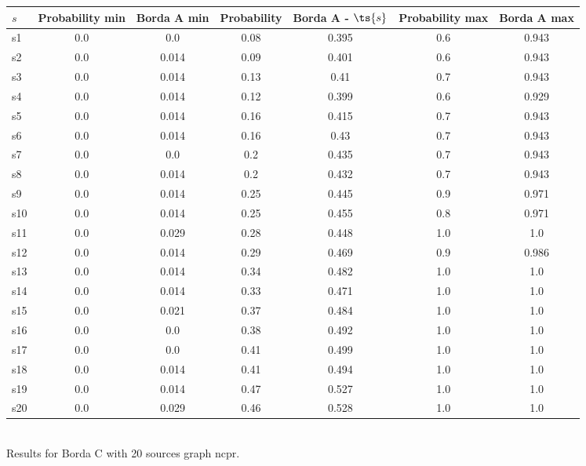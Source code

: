 \documentclass{article}
\begin{document}
\noindent\begin{tabular}{|l|c|c|c|c|c|c|}
\hline
$s$& Probability min & Borda A min & Probability & Borda A - $\ts{s}$ & Probability max & Borda A max\\
\hline
s1 &0.0 & 0.0 & 0.08 & 0.395 & 0.6 & 0.943\\
\hline
s2 &0.0 & 0.014 & 0.09 & 0.401 & 0.6 & 0.943\\
\hline
s3 &0.0 & 0.014 & 0.13 & 0.41 & 0.7 & 0.943\\
\hline
s4 &0.0 & 0.014 & 0.12 & 0.399 & 0.6 & 0.929\\
\hline
s5 &0.0 & 0.014 & 0.16 & 0.415 & 0.7 & 0.943\\
\hline
s6 &0.0 & 0.014 & 0.16 & 0.43 & 0.7 & 0.943\\
\hline
s7 &0.0 & 0.0 & 0.2 & 0.435 & 0.7 & 0.943\\
\hline
s8 &0.0 & 0.014 & 0.2 & 0.432 & 0.7 & 0.943\\
\hline
s9 &0.0 & 0.014 & 0.25 & 0.445 & 0.9 & 0.971\\
\hline
s10 &0.0 & 0.014 & 0.25 & 0.455 & 0.8 & 0.971\\
\hline
s11 &0.0 & 0.029 & 0.28 & 0.448 & 1.0 & 1.0\\
\hline
s12 &0.0 & 0.014 & 0.29 & 0.469 & 0.9 & 0.986\\
\hline
s13 &0.0 & 0.014 & 0.34 & 0.482 & 1.0 & 1.0\\
\hline
s14 &0.0 & 0.014 & 0.33 & 0.471 & 1.0 & 1.0\\
\hline
s15 &0.0 & 0.021 & 0.37 & 0.484 & 1.0 & 1.0\\
\hline
s16 &0.0 & 0.0 & 0.38 & 0.492 & 1.0 & 1.0\\
\hline
s17 &0.0 & 0.0 & 0.41 & 0.499 & 1.0 & 1.0\\
\hline
s18 &0.0 & 0.014 & 0.41 & 0.494 & 1.0 & 1.0\\
\hline
s19 &0.0 & 0.014 & 0.47 & 0.527 & 1.0 & 1.0\\
\hline
s20 &0.0 & 0.029 & 0.46 & 0.528 & 1.0 & 1.0\\
\hline
\end{tabular}\\

\noindent Results for Borda C with 20 sources graph ncpr.
\end{document}
